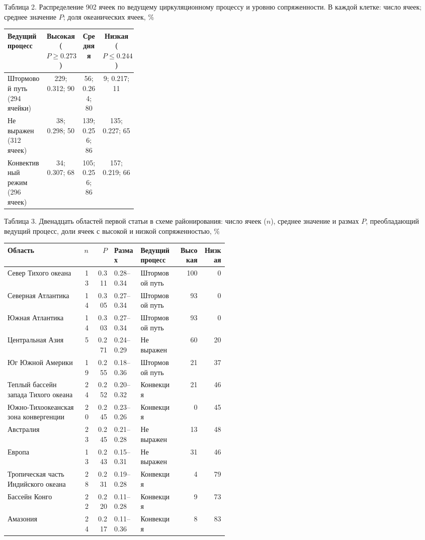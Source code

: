 \documentclass[12pt,a4paper]{article}
\begin{document}
\clearpage
\noindent Таблица 2. Распределение 902 ячеек по ведущему циркуляционному процессу и уровню сопряженности. В каждой клетке: число ячеек; среднее значение $P$; доля океанических ячеек, \%

\begin{singlespace}
\noindent\begin{tabular}{@{}>{\raggedright\arraybackslash}p{0.30\linewidth}ccc@{}}
\toprule
Ведущий процесс & Высокая ($P \ge 0.273$) & Средняя & Низкая ($P \le 0.244$)\\
\midrule
Штормовой путь (294 ячейки) & 229; 0.312; 90 & 56; 0.264; 80 & 9; 0.217; 11\\
Не выражен (312 ячеек) & 38; 0.298; 50 & 139; 0.256; 86 & 135; 0.227; 65\\
Конвективный режим (296 ячеек) & 34; 0.307; 68 & 105; 0.256; 86 & 157; 0.219; 66\\
\bottomrule
\end{tabular}
\end{singlespace}

\clearpage
\noindent Таблица 3. Двенадцать областей первой статьи в схеме районирования: число ячеек ($n$), среднее значение и размах $P$, преобладающий ведущий процесс, доли ячеек с высокой и низкой сопряженностью, \%

\begin{singlespace}
\noindent\begin{tabular}{@{}>{\raggedright\arraybackslash}p{0.34\linewidth}rrl>{\raggedright\arraybackslash}p{0.17\linewidth}rr@{}}
\toprule
Область & $n$ & $P$ & Размах & Ведущий процесс & Высокая & Низкая\\
\midrule
Север Тихого океана & 13 & 0.311 & 0.28--0.34 & Штормовой путь & 100 & 0\\
Северная Атлантика & 14 & 0.305 & 0.27--0.34 & Штормовой путь & 93 & 0\\
Южная Атлантика & 14 & 0.303 & 0.27--0.34 & Штормовой путь & 93 & 0\\
Центральная Азия & 5 & 0.271 & 0.24--0.29 & Не выражен & 60 & 20\\
Юг Южной Америки & 19 & 0.255 & 0.18--0.36 & Штормовой путь & 21 & 37\\
Теплый бассейн запада Тихого океана & 24 & 0.252 & 0.20--0.32 & Конвекция & 21 & 46\\
Южно-Тихоокеанская зона конвергенции & 20 & 0.245 & 0.23--0.26 & Конвекция & 0 & 45\\
Австралия & 23 & 0.245 & 0.21--0.28 & Не выражен & 13 & 48\\
Европа & 13 & 0.243 & 0.15--0.31 & Не выражен & 31 & 46\\
Тропическая часть Индийского океана & 28 & 0.231 & 0.19--0.28 & Конвекция & 4 & 79\\
Бассейн Конго & 22 & 0.220 & 0.11--0.28 & Конвекция & 9 & 73\\
Амазония & 24 & 0.217 & 0.11--0.36 & Конвекция & 8 & 83\\
\bottomrule
\end{tabular}
\end{singlespace}
\end{document}
